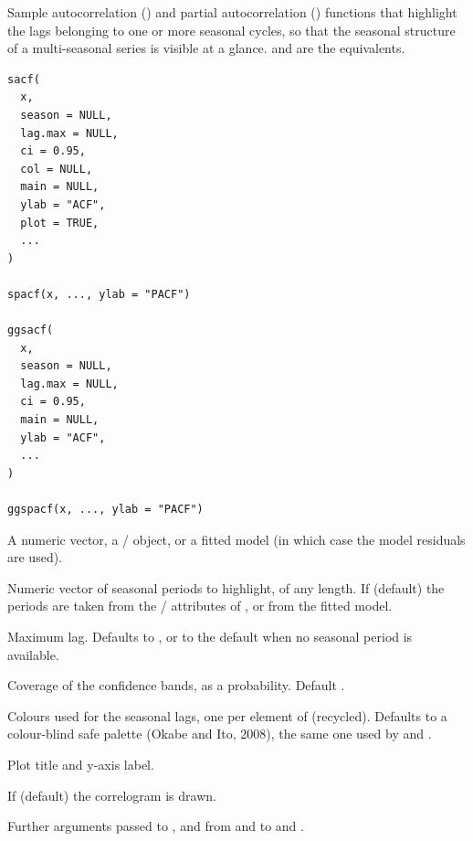\documentclass[a4paper]{book}
\begin{document}
\begin{Description}
Sample autocorrelation () and partial autocorrelation () functions
that highlight the lags belonging to one or more seasonal cycles, so that the
seasonal structure of a multi-seasonal series is visible at a glance.
 and  are the  equivalents.
\end{Description}
%
\begin{Usage}
\begin{verbatim}
sacf(
  x,
  season = NULL,
  lag.max = NULL,
  ci = 0.95,
  col = NULL,
  main = NULL,
  ylab = "ACF",
  plot = TRUE,
  ...
)

spacf(x, ..., ylab = "PACF")

ggsacf(
  x,
  season = NULL,
  lag.max = NULL,
  ci = 0.95,
  main = NULL,
  ylab = "ACF",
  ...
)

ggspacf(x, ..., ylab = "PACF")
\end{verbatim}
\end{Usage}
%
\begin{Arguments}
\begin{ldescription}
\item[\code{x}] A numeric vector, a / object, or a fitted  model
(in which case the model residuals are used).

\item[\code{season}] Numeric vector of seasonal periods to highlight, of any length.
If  (default) the periods are taken from the / attributes of
, or from the fitted model.

\item[\code{lag.max}] Maximum lag. Defaults to , or to the
 default when no seasonal period is available.

\item[\code{ci}] Coverage of the confidence bands, as a probability. Default .

\item[\code{col}] Colours used for the seasonal lags, one per element of 
(recycled). Defaults to a colour-blind safe palette (Okabe and Ito, 2008),
the same one used by  and .

\item[\code{main}, \code{ylab}] Plot title and y-axis label.

\item[\code{plot}] If  (default) the correlogram is drawn.

\item[\code{...}] Further arguments passed to , and from  and
 to  and .
\end{ldescription}
\end{Arguments}
\end{document}
